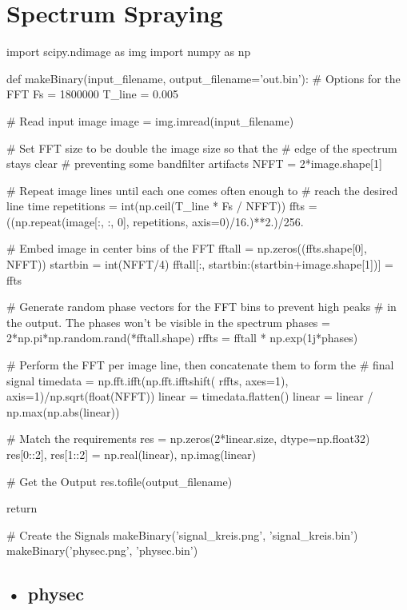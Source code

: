 \documentclass[12pt,a4paper]{article}
\begin{document}
\section{Spectrum Spraying}
\begin{python}
import scipy.ndimage as img
import numpy as np


def makeBinary(input_filename, output_filename='out.bin'):
	# Options for the FFT
	Fs = 1800000
	T_line = 0.005

	# Read input image
	image = img.imread(input_filename)

	# Set FFT size to be double the image size so that the
	# edge of the spectrum stays clear
	# preventing some bandfilter artifacts
	NFFT = 2*image.shape[1]

	# Repeat image lines until each one comes often enough to
	# reach the desired line time
	repetitions = int(np.ceil(T_line * Fs / NFFT))
	ffts = ((np.repeat(image[:, :, 0], repetitions, axis=0)/16.)**2.)/256.

	# Embed image in center bins of the FFT
	fftall = np.zeros((ffts.shape[0], NFFT))
	startbin = int(NFFT/4)
	fftall[:, startbin:(startbin+image.shape[1])] = ffts

	# Generate random phase vectors for the FFT bins to prevent high peaks 
	# in the output. The phases won't be visible in the spectrum
	phases = 2*np.pi*np.random.rand(*fftall.shape)
	rffts = fftall * np.exp(1j*phases)

	# Perform the FFT per image line, then concatenate them to form the
	# final signal
	timedata = np.fft.ifft(np.fft.ifftshift(
		rffts, axes=1), axis=1)/np.sqrt(float(NFFT))
	linear = timedata.flatten()
	linear = linear / np.max(np.abs(linear))

	# Match the requirements
	res = np.zeros(2*linear.size, dtype=np.float32)
	res[0::2], res[1::2] = np.real(linear), np.imag(linear)

	# Get the Output
	res.tofile(output_filename)

	return

# Create the Signals
makeBinary('signal_kreis.png', 'signal_kreis.bin')
makeBinary('physec.png', 'physec.bin')
\end{python}

\subsection*{• physec}
\end{document}
